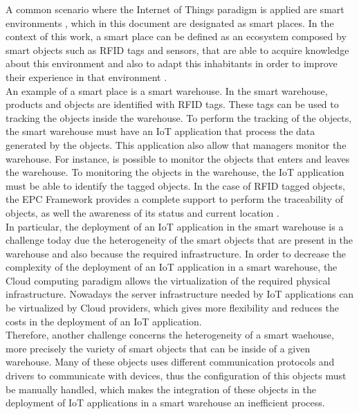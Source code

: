 A common scenario where the Internet of Things paradigm is applied are smart environments \cite{atzori2010internet},
which in this document are designated as smart places. In the context of this work,
a smart place can be defined as an ecosystem composed by smart objects such as RFID
tags and sensors, that are able to acquire knowledge about this environment and also to
adapt this inhabitants in order to improve their experience in that environment \cite{cook2004smart}.\\

An example of a smart place is a smart warehouse. In the smart warehouse, products and objects
are identified with RFID tags. These tags can be used to tracking the objects inside the warehouse.
To perform the tracking of the objects, the smart warehouse must have an IoT application that process
the data generated by the objects. This application also allow that managers monitor the warehouse.
For instance, is possible to monitor the objects that enters and leaves the warehouse.
To monitoring the objects in the warehouse, the IoT application must be able to identify
the tagged objects. In the case of RFID tagged objects, the EPC Framework provides a complete
support to perform the traceability of objects, as well the awareness of its status and
current location \cite{atzori2010internet}.\\

In particular, the deployment of an IoT application in the smart warehouse is a challenge today
due the heterogeneity of the smart objects that are present in the warehouse and also
because the required infrastructure. In order to decrease the complexity of the deployment
of an IoT application in a smart warehouse, the Cloud computing paradigm allows the virtualization
of the required physical infrastructure. Nowadays the server infrastructure needed by IoT
applications can be virtualized by Cloud providers, which gives more flexibility and reduces
the costs in the deployment of an IoT application.\\

Therefore, another challenge concerns the heterogeneity of a smart waehouse, more precisely
the variety of smart objects that can be inside of a given warehouse. Many of these objects uses
different communication protocols and drivers to communicate with devices, thus the configuration
of this objects must be manually handled, which makes the integration of these objects in
the deployment of IoT applications in a smart warehouse an inefficient process.
